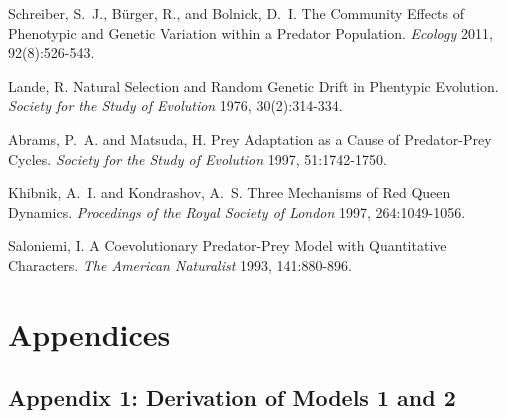 \documentclass{amsart}
\theoremstyle{definition}
\theoremstyle{remark}
\numberwithin{equation}{section}
\begin{document}
\FloatBarrier
\pagebreak

\begin{thebibliography}{10}

Schreiber, S.~J., B\"urger,  R., and Bolnick,  D.~I.
The Community Effects of Phenotypic and Genetic Variation within a Predator Population.
\emph{Ecology}
2011,  92(8):526-543. 

Lande, R.
Natural Selection and Random Genetic Drift in Phentypic Evolution.
\emph{Society for the Study of Evolution}
1976, 30(2):314-334.

Abrams, P.~A. and Matsuda, H.
Prey Adaptation as a Cause of Predator-Prey Cycles.
\emph{Society for the Study of Evolution}
1997, 51:1742-1750.

Khibnik, A.~I. and Kondrashov, A.~S.
Three Mechanisms of Red Queen Dynamics.
\emph{Procedings of the Royal Society of London}
1997, 264:1049-1056.

Saloniemi, I.
A Coevolutionary Predator-Prey Model with Quantitative Characters.
\emph{The American Naturalist}
1993, 141:880-896.

\end{thebibliography}


































\FloatBarrier
\pagebreak
\section{Appendices}
\subsection{Appendix 1: Derivation of Models 1 and 2}
\end{document}

